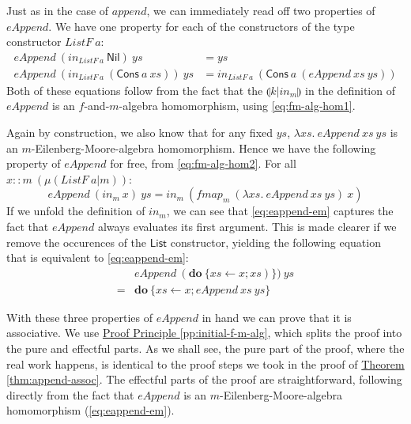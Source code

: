 \documentclass{jfp1}
\newcommand{\eFold}[2]{\llparenthesis #1|#2 \rrparenthesis}
\newcommand{\proofprinref}[1]{\hyperref[#1]{Proof Principle \ref*{#1}}}
\newcommand{\thmref}[1]{\hyperref[#1]{Theorem \ref*{#1}}}
\begin{document}
Just as in the case of $\mathit{append}$, we can immediately read off
two properties of $\mathit{eAppend}$. We have one property for each of
the constructors of the type constructor $\mathit{ListF}~a$:
\begin{align}
  \label{eq:eAppend-nil}
  \mathit{eAppend}~(\mathit{in}_{\mathit{ListF}~a}~\mathsf{Nil})~\mathit{ys} & = \mathit{ys} \\
  \label{eq:eAppend-cons}
  \mathit{eAppend}~(\mathit{in}_{\mathit{ListF}~a}~(\mathsf{Cons}~a~\mathit{xs}))~\mathit{ys} & = \mathit{in}_{\mathit{ListF}~a}~(\mathsf{Cons}~a~(\mathit{eAppend}~\mathit{xs}~\mathit{ys}))
\end{align}
Both of these equations follow from the fact that the
$\eFold{k}{\mathit{in}_m}$ in the definition of $\mathit{eAppend}$ is
an $f$-and-$m$-algebra homomorphism, using \autoref{eq:fm-alg-hom1}.

Again by construction, we also know that for any fixed $\mathit{ys}$,
$\lambda \mathit{xs}.~\mathit{eAppend}~\mathit{xs}~\mathit{ys}$ is an
$m$-Eilenberg-Moore-algebra homomorphism. Hence we have the following
property of $\mathit{eAppend}$ for free, from
\autoref{eq:fm-alg-hom2}. For all $x :: m~(\mu(\mathit{ListF}~a|m))$:
\begin{equation}\label{eq:eappend-em}
  \mathit{eAppend}~(\mathit{in}_m~\mathit{x})~\mathit{ys} = \mathit{in}_m~(\mathit{fmap}_m~(\lambda \mathit{xs}.~\mathit{eAppend}~\mathit{xs}~\mathit{ys})~\mathit{x})
\end{equation}
If we unfold the definition of $\mathit{in}_m$, we can see that
\autoref{eq:eappend-em} captures the fact that $\mathit{eAppend}$
always evaluates its first argument. This is made clearer if we remove
the occurences of the $\mathsf{List}$ constructor, yielding the
following equation that is equivalent to \autoref{eq:eappend-em}:
\begin{displaymath}
  \begin{array}{ll}
     & \mathit{eAppend}~(\mathbf{do}~\{\mathit{xs} \leftarrow x; \mathit{xs}) \})~\mathit{ys} \\
    =& \mathbf{do}~\{ \mathit{xs} \leftarrow x; \mathit{eAppend}~\mathit{xs}~\mathit{ys} \}
  \end{array}
\end{displaymath}

With these three properties of $\mathit{eAppend}$ in hand we can prove
that it is associative. We use \proofprinref{pp:initial-f-m-alg},
which splits the proof into the pure and effectful parts. As we shall
see, the pure part of the proof, where the real work happens, is
identical to the proof steps we took in the proof of
\thmref{thm:append-assoc}. The effectful parts of the proof are
straightforward, following directly from the fact that
$\mathit{eAppend}$ is an $m$-Eilenberg-Moore-algebra homomorphism
(\autoref{eq:eappend-em}).
\end{document}

